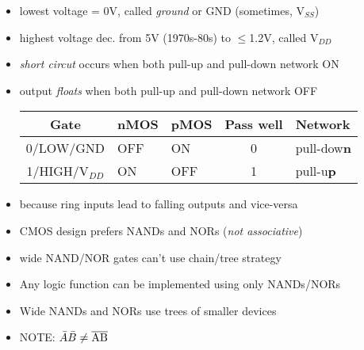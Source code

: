 \begin{itemize}
\item lowest voltage = 0V, called \emph{ground} or GND (sometimes, V$_{SS}$)
\item highest voltage dec. from 5V (1970s-80s) to $\leqslant$1.2V, called V$_{DD}$
\item \emph{short circut} occurs when both pull-up and pull-down network ON
\item output \emph{floats} when both pull-up and pull-down network OFF
\begin{tabular}[h]{cllcl}
  \hline
  Gate & nMOS & pMOS & Pass well & Network  \\
  \hline
  0/LOW/GND & OFF & ON  & 0 &  pull-dow\textbf{n}\\
  1/HIGH/V$_{DD}$ & ON & OFF & 1 & pull-u\textbf{p}\\
  \hline
\end{tabular}
\item because ring inputs lead to falling outputs and vice-versa
\item CMOS design prefers NANDs and NORs (\emph{not associative})
\item wide NAND/NOR gates can't use chain/tree strategy
\item Any logic function can be implemented using only NANDs/NORs
\item Wide NANDs and NORs use trees of smaller devices
\item NOTE: $\bar{A}\bar{B} \neq \overline{\rm AB}$
\end{itemize}

\def\normalcoord(#1){coordinate(#1)}
\def\showcoord(#1){coordinate(#1) node[circle, red, draw, inner sep=1pt,
pin={[red, overlay, inner sep=0.5pt, font=\tiny, pin distance=0.1cm,
pin edge={red, overlay}]45:#1}](){}}
\let\coord=\normalcoord
\let\coord=\showcoord %
\def\killdepth#1{{\raisebox{0pt}[\height][0pt]{#1}}} %

